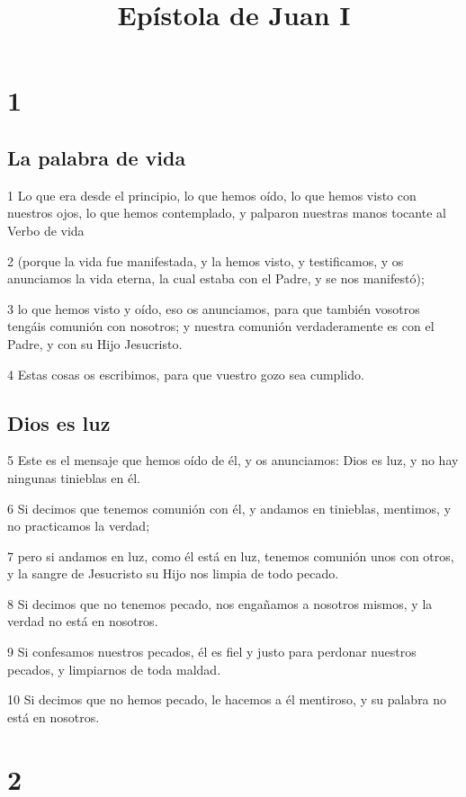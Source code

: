 
\title{Epístola de Juan I}


\chapter{1}

\section*{La palabra de vida}

\par 1 Lo que era desde el principio, lo que hemos oído, lo que hemos visto con nuestros ojos, lo que hemos contemplado, y palparon nuestras manos tocante al Verbo de vida
\par 2 (porque la vida fue manifestada, y la hemos visto, y testificamos, y os anunciamos la vida eterna, la cual estaba con el Padre, y se nos manifestó);
\par 3 lo que hemos visto y oído, eso os anunciamos, para que también vosotros tengáis comunión con nosotros; y nuestra comunión verdaderamente es con el Padre, y con su Hijo Jesucristo.
\par 4 Estas cosas os escribimos, para que vuestro gozo sea cumplido.

\section*{Dios es luz}

\par 5 Este es el mensaje que hemos oído de él, y os anunciamos: Dios es luz, y no hay ningunas tinieblas en él.
\par 6 Si decimos que tenemos comunión con él, y andamos en tinieblas, mentimos, y no practicamos la verdad;
\par 7 pero si andamos en luz, como él está en luz, tenemos comunión unos con otros, y la sangre de Jesucristo su Hijo nos limpia de todo pecado.
\par 8 Si decimos que no tenemos pecado, nos engañamos a nosotros mismos, y la verdad no está en nosotros.
\par 9 Si confesamos nuestros pecados, él es fiel y justo para perdonar nuestros pecados, y limpiarnos de toda maldad.
\par 10 Si decimos que no hemos pecado, le hacemos a él mentiroso, y su palabra no está en nosotros.

\chapter{2}

